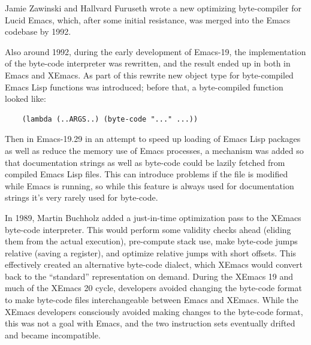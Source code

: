 \documentclass[format=acmsmall, review]{acmart}
\newcommand \Elisp {Emacs Lisp}
\begin{document}
Jamie Zawinski and Hallvard Furuseth wrote a new optimizing
byte-compiler for Lucid Emacs, which, after some initial resistance, was
merged into the Emacs codebase by 1992.

Also around 1992, during the early development of Emacs-19, the
implementation of the byte-code interpreter was rewritten, and the
result ended up in both in Emacs and XEmacs.
As part of this rewrite new object type for byte-compiled \Elisp{}
functions was introduced; before that, a byte-compiled function looked
like:
\begin{verbatim}
    (lambda (..ARGS..) (byte-code "..." ...))
\end{verbatim}
Then in Emacs-19.29 in an attempt to speed up loading of \Elisp{} packages
as well as reduce the memory use of Emacs processes, a mechanism was added
so that documentation strings as well as byte-code could be lazily fetched
from compiled \Elisp{} files.  This can introduce problems if the file is
modified while Emacs is running, so while this feature is always used
for documentation strings it's very rarely used for byte-code.


In 1989, Martin Buchholz added a just-in-time optimization pass to the
XEmacs byte-code interpreter.  This
would perform some validity checks ahead (eliding them from the actual
execution), pre-compute stack use, make byte-code jumps relative
(saving a register), and optimize relative jumps with short offsets.
This effectively created an alternative byte-code dialect, which
XEmacs would convert back to the ``standard'' representation on
demand.
During the XEmacs 19 and much of the XEmacs 20 cycle, developers
avoided changing the byte-code format to make byte-code files
interchangeable between Emacs and XEmacs.  While
the XEmacs developers consciously avoided making changes to the
byte-code format, this was not a goal with Emacs, and the two
instruction sets eventually drifted and became incompatible.
\end{document}
